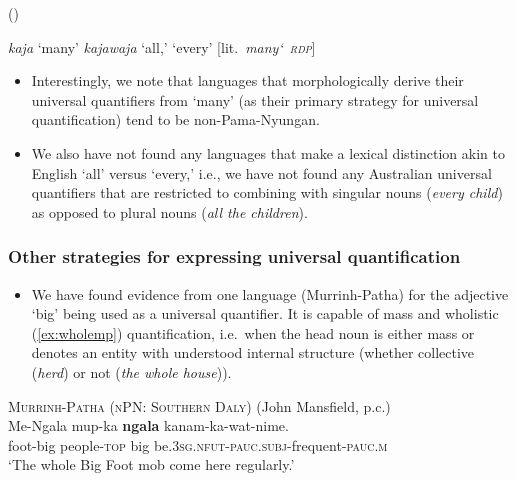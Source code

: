 \documentclass{article}
\begin{document}
\newpage

\begin{exe}
   (\citealt[54]{mushin12})
  \begin{xlist}
    \ex \textit{kaja} `many'
    \ex \textit{kajawaja}  `all,' `every' [lit.\ \textit{many\char`~\textsc{rdp}}]
  \end{xlist}
\end{exe}


\begin{itemize}
\item Interestingly, we note that languages that morphologically derive their universal quantifiers from `many' (as their primary strategy for universal quantification) tend to be non-Pama-Nyungan.
\item We also have not found any languages that make a lexical distinction akin to English `all' versus `every,' i.e., we have not found any Australian universal quantifiers that are restricted to combining with singular nouns ({\it every child}) as opposed to plural nouns ({\it all the children}).
\end{itemize}

\subsubsection{Other strategies for expressing universal quantification
  \label{sec:uqbig}}

\begin{itemize}
\item We have found evidence from one language (Murrinh-Patha) for the adjective `big' being used as a universal quantifier. It is capable of mass and wholistic (\ref{ex:wholemp}) quantification, i.e.\ when the head noun is either mass or denotes an entity with understood internal structure (whether collective (\textit{herd}) or not (\textit{the whole house})).
\end{itemize}
\begin{exe}
  \ex\label{ex:wholemp} \textsc{Murrinh-Patha (nPN: Southern Daly)} (John Mansfield, p.c.)\\
  \gll Me-Ngala mup-ka     \textbf{ngala} kanam-ka-wat-nime.\\
  foot-big  people-\textsc{top} big  be.\textsc{3sg.nfut-pauc.subj}-frequent-\textsc{pauc.m}\\
  \glt `The whole Big Foot mob come here regularly.' %
\end{exe}
\end{document}
